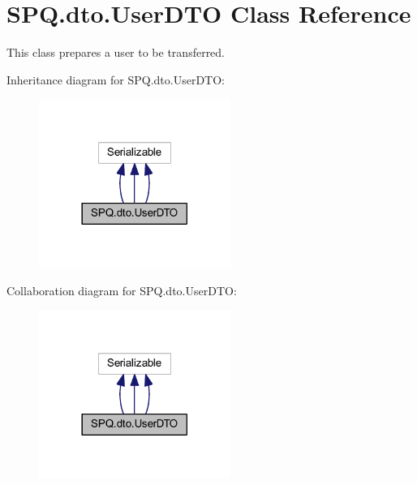 \hypertarget{class_s_p_q_1_1dto_1_1_user_d_t_o}{}\section{S\+P\+Q.\+dto.\+User\+D\+TO Class Reference}
\label{class_s_p_q_1_1dto_1_1_user_d_t_o}


This class prepares a user to be transferred.  




Inheritance diagram for S\+P\+Q.\+dto.\+User\+D\+TO\+:\nopagebreak
\begin{figure}[H]
\begin{center}
\leavevmode
\includegraphics[width=177pt]{class_s_p_q_1_1dto_1_1_user_d_t_o__inherit__graph}
\end{center}
\end{figure}


Collaboration diagram for S\+P\+Q.\+dto.\+User\+D\+TO\+:\nopagebreak
\begin{figure}[H]
\begin{center}
\leavevmode
\includegraphics[width=177pt]{class_s_p_q_1_1dto_1_1_user_d_t_o__coll__graph}
\end{center}
\end{figure}
